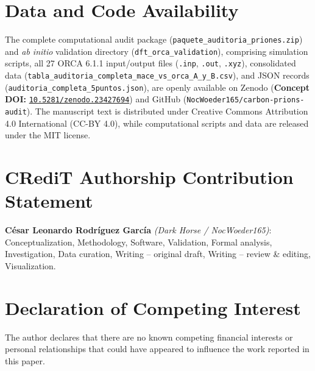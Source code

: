 \documentclass[10pt,twocolumn,a4paper]{article}
\begin{document}
\section*{Data and Code Availability}
\footnotesize
The complete computational audit package (\texttt{paquete\_auditoria\_priones.zip}) and \textit{ab initio} validation directory (\texttt{dft\_orca\_validation}), comprising simulation scripts, all 27 ORCA 6.1.1 input/output files (\texttt{.inp}, \texttt{.out}, \texttt{.xyz}), consolidated data (\texttt{tabla\_auditoria\_completa\_mace\_vs\_orca\_A\_y\_B.csv}), and JSON records (\texttt{auditoria\_completa\_5puntos.json}), are openly available on Zenodo (\textbf{Concept DOI:} \href{https://doi.org/10.5281/zenodo.23427694}{\texttt{10.5281/zenodo.23427694}}) and GitHub (\texttt{NocWoeder165/carbon-prions-audit}). The manuscript text is distributed under Creative Commons Attribution 4.0 International (CC-BY 4.0), while computational scripts and data are released under the MIT license.

\section*{CRediT Authorship Contribution Statement}
\footnotesize
\textbf{César Leonardo Rodríguez García} \textit{(Dark Horse / NocWoeder165)}: Conceptualization, Methodology, Software, Validation, Formal analysis, Investigation, Data curation, Writing -- original draft, Writing -- review \& editing, Visualization.

\section*{Declaration of Competing Interest}
\footnotesize
The author declares that there are no known competing financial interests or personal relationships that could have appeared to influence the work reported in this paper.
\end{document}
